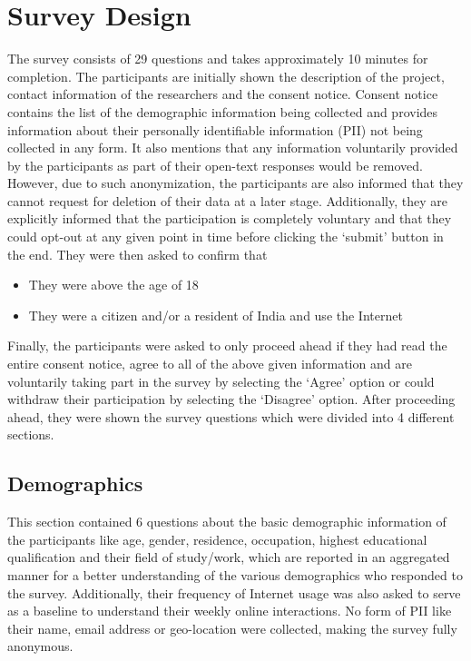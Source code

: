 \section{Survey Design} \label{Sec:Privacy Notice}

The survey consists of 29 questions and takes approximately 10 minutes for completion. The participants are initially shown the description of the project, contact information of the researchers and the consent notice. Consent notice contains the list of the demographic information being collected and provides information about their personally identifiable information (PII) not being collected in any form. It also mentions that any information voluntarily provided by the participants as part of their open-text responses would be removed. However, due to such anonymization, the participants are also informed that they cannot request for deletion of their data at a later stage. Additionally, they are explicitly informed that the participation is completely voluntary and that they could opt-out at any given point in time before clicking the `submit' button in the end. They were then asked to confirm that \begin{itemize}
    \item They were above the age of 18
    \item They were a citizen and/or a resident of India and use the Internet
\end{itemize}
Finally, the participants were asked to only proceed ahead if they had read the entire consent notice, agree to all of the above given information and are voluntarily taking part in the survey by selecting the `Agree' option or could withdraw their participation by selecting the `Disagree' option. After proceeding ahead, they were shown the survey questions which were divided into 4 different sections.  

\subsection{Demographics} \label{Subsec: Demographics}

This section contained 6 questions about the basic demographic information of the participants like age, gender, residence, occupation, highest educational qualification and their field of study/work, which are reported in an aggregated manner for a better understanding of the various demographics who responded to the survey. Additionally, their frequency of Internet usage was also asked to serve as a baseline to understand their weekly online interactions. No form of PII like their name, email address or geo-location were collected, making the survey fully anonymous. 


